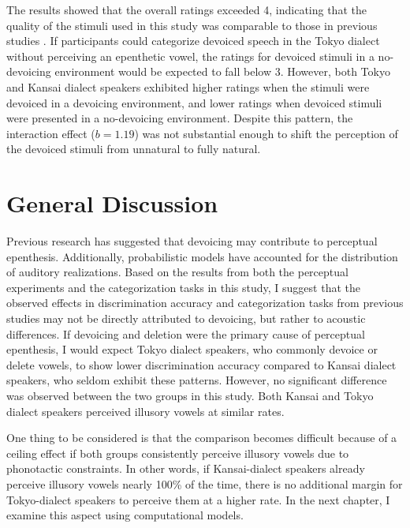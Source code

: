 The results showed that the overall ratings exceeded 4, indicating that the quality of the stimuli used in this study was comparable to those in previous studies \parencite{kilpatrick2018japanese}. If participants could categorize devoiced speech in the Tokyo dialect without perceiving an epenthetic vowel, the ratings for devoiced stimuli in a no-devoicing environment would be expected to fall below 3. However, both Tokyo and Kansai dialect speakers exhibited higher ratings when the stimuli were devoiced in a devoicing environment, and lower ratings when devoiced stimuli were presented in a no-devoicing environment. Despite this pattern, the interaction effect ($b = 1.19$) was not substantial enough to shift the perception of the devoiced stimuli from unnatural to fully natural.

\section{General Discussion}

Previous research has suggested that devoicing may contribute to perceptual epenthesis.
Additionally, probabilistic models have accounted for the distribution of auditory realizations.
Based on the results from both the perceptual experiments and the categorization tasks in this study,
I suggest that the observed effects in discrimination accuracy and categorization tasks from previous studies
may not be directly attributed to devoicing,
but rather to acoustic differences.
If devoicing and deletion were the primary cause of perceptual epenthesis,
I would expect Tokyo dialect speakers,
who commonly devoice or delete vowels,
to show lower discrimination accuracy compared to Kansai dialect speakers,
who seldom exhibit these patterns.
However,
no significant difference was observed between the two groups in this study.
Both Kansai and Tokyo dialect speakers perceived illusory vowels at similar rates.

One thing to be considered is that the comparison becomes difficult because of a ceiling effect
if both groups consistently perceive illusory vowels due to phonotactic constraints.
In other words, if Kansai-dialect speakers already perceive illusory vowels nearly 100\% of the time,
there is no additional margin for Tokyo-dialect speakers to perceive them at a higher rate.
In the next chapter, I examine this aspect using computational models.

% 
% 
